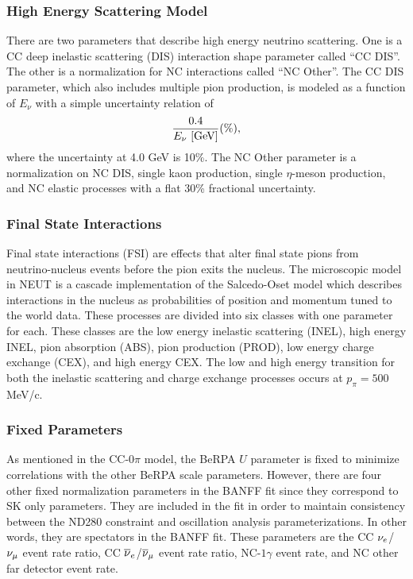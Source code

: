\subsubsection{High Energy Scattering Model}

There are two parameters that describe high energy neutrino scattering.
One is a CC deep inelastic scattering (DIS) interaction shape parameter
called ``CC DIS''. The other is a normalization for NC interactions
called ``NC Other''. The CC DIS parameter, which also includes multiple
pion production, is modeled as a function of $E_{\nu}$ with a simple
uncertainty relation of 
\[
\frac{0.4}{E_{\nu}\text{ [GeV]}}(\%),
\]
where the uncertainty at 4.0 GeV is 10\%. The NC Other parameter is
a normalization on NC DIS, single kaon production, single $\eta$-meson
production, and NC elastic processes with a flat 30\% fractional uncertainty\cite{Wret2019}.

\subsubsection{Final State Interactions}

Final state interactions\cite{Golan:2012wx} (FSI) are effects that
alter final state pions from neutrino-nucleus events before the pion
exits the nucleus. The microscopic model in NEUT is a cascade implementation
of the Salcedo-Oset model\cite{SALCEDO1988557} which describes interactions
in the nucleus as probabilities of position and momentum tuned to
the world data\cite{PhysRevC.18.584}. These processes are divided
into six classes with one parameter for each. These classes are the
low energy inelastic scattering (INEL), high energy INEL, pion absorption
(ABS), pion production (PROD), low energy charge exchange (CEX), and
high energy CEX. The low and high energy transition for both the inelastic
scattering and charge exchange processes occurs at $p_{\pi}=500$
MeV/c.

\subsubsection{Fixed Parameters}

As mentioned in the CC-$0\pi$ model, the BeRPA $U$ parameter is
fixed to minimize correlations with the other BeRPA scale parameters.
However, there are four other fixed normalization parameters in the
BANFF fit since they correspond to SK only parameters. They are included
in the fit in order to maintain consistency between the ND280 constraint
and oscillation analysis parameterizations. In other words, they are
spectators in the BANFF fit. These parameters are the CC $\nu_{e}$/$\nu_{\mu}$
event rate ratio, CC $\overline{\nu}_{e}$/$\overline{\nu}_{\mu}$ event rate ratio, NC-$1\gamma$
event rate, and NC other far detector event rate.

